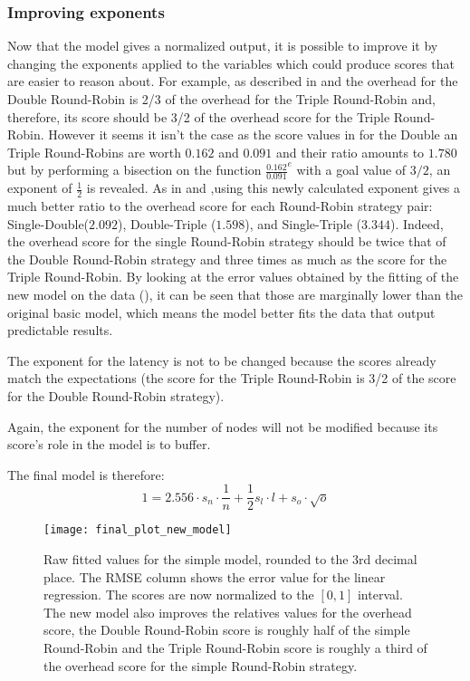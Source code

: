 \subsubsection{Improving exponents}
Now that the model gives a normalized output, it is possible to improve it by
changing the exponents applied to the variables which could produce scores that
are easier to reason about. For example, as described in 
and  the
overhead for the Double Round-Robin is 2/3 of the overhead for the Triple
Round-Robin and, therefore, its score should be 3/2 of the overhead score for the
Triple Round-Robin. 
However it seems it isn't the case as the score values in 
for the Double an Triple Round-Robins are worth $0.162$ and $0.091$ and their
ratio amounts to $1.780$ but by performing a bisection on the function
\(\frac{0.162}{0.091}^e\) with a goal value of $3/2$, an exponent of
\(\frac{1}{2}\) is revealed.
As in  and ,using this newly
calculated exponent gives a much better ratio to the overhead score for each
Round-Robin strategy pair: Single-Double($2.092$), Double-Triple ($1.598$), and
Single-Triple ($3.344$).
Indeed, the overhead score for the single Round-Robin strategy
should be twice that of the Double Round-Robin strategy and three times as
much as the score for the Triple Round-Robin. By looking at the error values
obtained by the fitting of the new model on the data
(), it can be seen that those are marginally lower than
the original basic model, which means the model better fits the data that output
predictable results. 

The exponent for the latency is not to be changed because the scores already
match the expectations (the score for the Triple Round-Robin is 3/2 of the score
for the Double Round-Robin strategy). 

Again, the exponent for the number of nodes will not be modified because its
score's role in the model is to buffer.

The final model is therefore: 
\[1 = 2.556\cdot s_n \cdot \frac{1}{n} + \frac{1}{2} s_l\cdot l + s_o\cdot
\sqrt{o}\]

\begin{figure}[h]
    \centering
    \texttt{[image: final\_plot\_new\_model]}
    \caption{Raw fitted values for the simple model, rounded to the 3rd
        decimal place. The RMSE column shows the error value for the linear
        regression. The scores are now normalized to the \([0, 1]\)
        interval. The new model also improves the relatives values for the
        overhead score, the Double Round-Robin score is roughly half of
        the simple Round-Robin and the Triple Round-Robin score is roughly a
        third of the overhead score for the simple Round-Robin strategy.}
    \label{fig:recapTestsPlotNew}
\end{figure}

